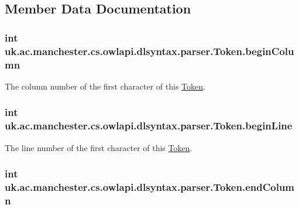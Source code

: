 \subsection{Member Data Documentation}
\hypertarget{classuk_1_1ac_1_1manchester_1_1cs_1_1owlapi_1_1dlsyntax_1_1parser_1_1_token_a636a57e3d66636abad3afa8b0e9af8d7}{
\subsubsection[{begin\-Column}]{\setlength{\rightskip}{0pt plus 5cm}int uk.\-ac.\-manchester.\-cs.\-owlapi.\-dlsyntax.\-parser.\-Token.\-begin\-Column}}\label{classuk_1_1ac_1_1manchester_1_1cs_1_1owlapi_1_1dlsyntax_1_1parser_1_1_token_a636a57e3d66636abad3afa8b0e9af8d7}
The column number of the first character of this \hyperlink{classuk_1_1ac_1_1manchester_1_1cs_1_1owlapi_1_1dlsyntax_1_1parser_1_1_token}{Token}. \hypertarget{classuk_1_1ac_1_1manchester_1_1cs_1_1owlapi_1_1dlsyntax_1_1parser_1_1_token_a97cbb0be6e0f60e79b91ac750572c5df}{
\subsubsection[{begin\-Line}]{\setlength{\rightskip}{0pt plus 5cm}int uk.\-ac.\-manchester.\-cs.\-owlapi.\-dlsyntax.\-parser.\-Token.\-begin\-Line}}\label{classuk_1_1ac_1_1manchester_1_1cs_1_1owlapi_1_1dlsyntax_1_1parser_1_1_token_a97cbb0be6e0f60e79b91ac750572c5df}
The line number of the first character of this \hyperlink{classuk_1_1ac_1_1manchester_1_1cs_1_1owlapi_1_1dlsyntax_1_1parser_1_1_token}{Token}. \hypertarget{classuk_1_1ac_1_1manchester_1_1cs_1_1owlapi_1_1dlsyntax_1_1parser_1_1_token_af1af0b3c00334e3be2c107296da57bde}{
\subsubsection[{end\-Column}]{\setlength{\rightskip}{0pt plus 5cm}int uk.\-ac.\-manchester.\-cs.\-owlapi.\-dlsyntax.\-parser.\-Token.\-end\-Column}}\label{classuk_1_1ac_1_1manchester_1_1cs_1_1owlapi_1_1dlsyntax_1_1parser_1_1_token_af1af0b3c00334e3be2c107296da57bde}
